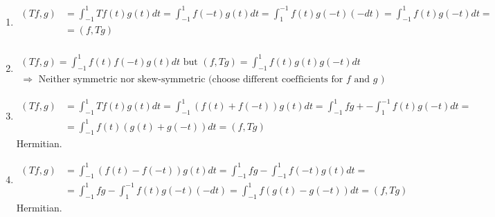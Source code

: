 \documentclass[twoside]{amsart}
\theoremstyle{plain}
\theoremstyle{definition}
\newcommand{\exercisehead}[1]
  {
   \noindent{\small\bf Exercise #1.}
   \smallskip}
\begin{document}
\exercisehead{7}
\begin{enumerate}
  \item \[ \begin{aligned} (Tf,g) & = \int_{-1}^1 Tf(t)g(t) dt = \int_{-1}^1 f(-t)g(t) dt = \int_1^{-1}f(t)g(-t)(-dt) = \int_{-1}^1 f(t)g(-t)dt = \\
    & = (f,Tg) \\
  \end{aligned} \] 
    \item \[
      \begin{gathered}
	(Tf,g) = \int_{-1}^1 f(t)f(-t)g(t) dt \text{ but } (f,Tg) = \int_{-1}^1 f(t)g(t)g(-t) dt \\
	\Longrightarrow \text{ Neither symmetric nor skew-symmetric (choose different coefficients for $f$ and $g$ ) } 
      \end{gathered}
      \]
    \item \[
\begin{aligned}
  (Tf,g) & = \int_{-1}^1 Tf(t) g(t) dt = \int_{-1}^1 (f(t) + f(-t)) g(t) dt = \int_{-1}^1 fg + - \int_1^{-1} f(t)g(-t)dt = \\
  & = \int_{-1}^1 f(t)(g(t) + g(-t))dt = (f,Tg) 
\end{aligned}
\]  Hermitian.  
    \item \[
\begin{aligned}
  (Tf,g) & = \int_{-1}^1 (f(t)-f(-t)) g(t) dt = \int_{-1}^1 fg - \int_{-1}^1 f(-t)g(t) dt = \\
  & = \int_{-1}^1 fg - \int_1^{-1} f(t) g(-t) (-dt) = \int_{-1}^1 f(g(t) - g(-t)) dt = (f,Tg)
\end{aligned}
\] Hermitian.  
\end{enumerate}
\end{document}
